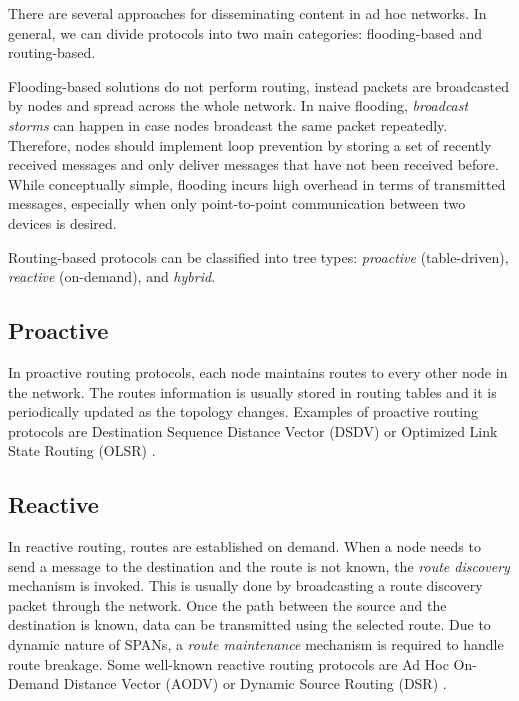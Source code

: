 \documentclass[conference,compsoc]{IEEEtran}
\begin{document}

There are several approaches for disseminating content in ad hoc networks. In general, we can divide protocols into two main categories: flooding-based and routing-based.

Flooding-based solutions do not perform routing, instead packets are broadcasted by nodes and spread across the whole network. In naive flooding, \textit{broadcast storms} can happen in case nodes broadcast the same packet repeatedly. Therefore, nodes should implement loop prevention by storing a set of recently received messages and only deliver messages that have not been received before. \cite{flooding} While conceptually simple, flooding incurs high overhead in terms of transmitted messages, especially when only point-to-point communication between two devices is desired.

Routing-based protocols can be classified into tree types: \textit{proactive} (table-driven), \textit{reactive} (on-demand), and \textit{hybrid}.

\subsection{Proactive}

In proactive routing protocols, each node maintains routes to every other node in the network. The routes information is usually stored in routing tables and it is periodically updated as the topology changes. \cite{routing} Examples of proactive routing protocols are Destination Sequence Distance Vector (DSDV) \cite{dsdv} or Optimized Link State Routing (OLSR) \cite{olsr}.

\subsection{Reactive}

In reactive routing, routes are established on demand. When a node needs to send a message to the destination and the route is not known, the \textit{route discovery} mechanism is invoked. This is usually done by broadcasting a route discovery packet through the network. Once the path between the source and the destination is known, data can be transmitted using the selected route. Due to dynamic nature of SPANs, a \textit{route maintenance} mechanism is required to handle route breakage.
Some well-known reactive routing protocols are Ad Hoc On-Demand Distance Vector (AODV) \cite{aodv} or Dynamic Source Routing (DSR) \cite{dsr}.
\end{document}
